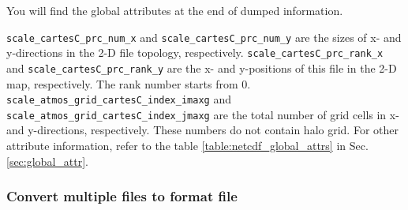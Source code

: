 You will find the global attributes at the end of dumped information.


\verb|scale_cartesC_prc_num_x| and \verb|scale_cartesC_prc_num_y| are the sizes of x- and y-directions in the 2-D file topology, respectively.
\verb|scale_cartesC_prc_rank_x| and \verb|scale_cartesC_prc_rank_y| are the x- and y-positions of this file in the 2-D map, respectively.
The rank number starts from 0.
\verb|scale_atmos_grid_cartesC_index_imaxg| and \verb|scale_atmos_grid_cartesC_index_jmaxg| are the total number of grid cells in x- and y-directions, respectively.
These numbers do not contain halo grid.
For other attribute information, refer to the table \ref{table:netcdf_global_attrs} in Sec. \ref{sec:global_attr}.




\subsubsection{Convert multiple \scalenetcdf files to \grads format file}
%

